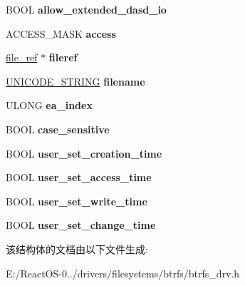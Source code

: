 \begin{DoxyCompactItemize}
B\+O\+OL {\bfseries allow\+\_\+extended\+\_\+dasd\+\_\+io}
\item 
\mbox{\label{struct__ccb_aaa5c3577341b7dba20e460d7b1dfe594}} 
A\+C\+C\+E\+S\+S\+\_\+\+M\+A\+SK {\bfseries access}
\item 
\mbox{\label{struct__ccb_ae6b56a38943f7ee12d0a456fef7e848d}} 
\hyperlink{struct__file__ref}{file\+\_\+ref} $\ast$ {\bfseries fileref}
\item 
\mbox{\label{struct__ccb_ad51d603f2b77f737e29402a7b56c46ae}} 
\hyperlink{struct___u_n_i_c_o_d_e___s_t_r_i_n_g}{U\+N\+I\+C\+O\+D\+E\+\_\+\+S\+T\+R\+I\+NG} {\bfseries filename}
\item 
\mbox{\label{struct__ccb_aeb8df1c3e035ebf26ccbe7f261253b07}} 
U\+L\+O\+NG {\bfseries ea\+\_\+index}
\item 
\mbox{\label{struct__ccb_a7260dc350847ab01e4253f30cdd9a02f}} 
B\+O\+OL {\bfseries case\+\_\+sensitive}
\item 
\mbox{\label{struct__ccb_adf78f2d3440f7a2a4bc601470ff93b7a}} 
B\+O\+OL {\bfseries user\+\_\+set\+\_\+creation\+\_\+time}
\item 
\mbox{\label{struct__ccb_aae18620dffd8036ab92d201470fa41bc}} 
B\+O\+OL {\bfseries user\+\_\+set\+\_\+access\+\_\+time}
\item 
\mbox{\label{struct__ccb_a2753558ae069bed83377600fd8bdd9b9}} 
B\+O\+OL {\bfseries user\+\_\+set\+\_\+write\+\_\+time}
\item 
\mbox{\label{struct__ccb_a3e87cfd98b01f8e27b15a8a54f7832a5}} 
B\+O\+OL {\bfseries user\+\_\+set\+\_\+change\+\_\+time}
\end{DoxyCompactItemize}


该结构体的文档由以下文件生成\+:\begin{DoxyCompactItemize}
\item 
E\+:/\+React\+O\+S-\/0../drivers/filesystems/btrfs/btrfs\+\_\+drv.\+h\end{DoxyCompactItemize}

